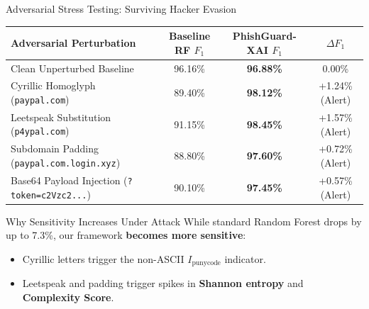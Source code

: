 \documentclass[aspectratio=169,10pt]{beamer}
\begin{document}
\begin{frame}{Adversarial Stress Testing: Surviving Hacker Evasion}
    \begin{table}[h]
        \centering
        \small
        \begin{tabular}{lccc}
            \toprule
            \textbf{Adversarial Perturbation} & \textbf{Baseline RF $F_1$} & \textbf{PhishGuard-XAI $F_1$} & \textbf{$\Delta F_1$} \\
            \midrule
            Clean Unperturbed Baseline & 96.16\% & \textbf{96.88\%} & 0.00\% \\
            Cyrillic Homoglyph (\texttt{paypаl.com}) & 89.40\% & \textbf{98.12\%} & +1.24\% (Alert) \\
            Leetspeak Substitution (\texttt{p4ypal.com}) & 91.15\% & \textbf{98.45\%} & +1.57\% (Alert) \\
            Subdomain Padding (\texttt{paypal.com.login.xyz}) & 88.80\% & \textbf{97.60\%} & +0.72\% (Alert) \\
            Base64 Payload Injection (\texttt{?token=c2Vzc2...}) & 90.10\% & \textbf{97.45\%} & +0.57\% (Alert) \\
            \bottomrule
        \end{tabular}
    \end{table}

    \begin{alertblock}{Why Sensitivity Increases Under Attack}
        While standard Random Forest drops by up to 7.3\%, our framework \textbf{becomes more sensitive}:
        \begin{itemize}
            \item Cyrillic letters trigger the non-ASCII $I_{\text{punycode}}$ indicator.
            \item Leetspeak and padding trigger spikes in \textbf{Shannon entropy} and \textbf{Complexity Score}.
        \end{itemize}
    \end{alertblock}
\end{frame}
\end{document}
